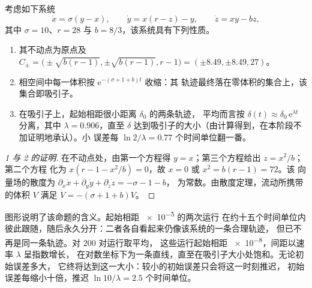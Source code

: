 \begin{proposition}[洛伦茨系统]\label{prop:b2:weather-systems:lorenz}
考虑如下系统
\[
  \dot x = \sigma(y - x), \qquad \dot y = x(r - z) - y, \qquad \dot z = xy - bz,
\]
其中 $\sigma = 10$、$r = 28$ 与 $b = 8/3$，该系统具有下列性质。
\begin{enumerate}
  \item 其不动点为原点及 $C_\pm = \bigl(\pm\sqrt{b(r - 1)}, \pm\sqrt{b(r - 1)},
        r - 1\bigr) = (\pm 8.49, \pm 8.49, 27)$。
  \item 相空间中每一体积按 $\mathrm{e}^{-(\sigma + 1 + b)t}$ 收缩：其
        轨迹最终落在零体积的集合上，该集合即吸引子。
  \item 在吸引子上，起始相距很小距离 $\delta_0$ 的两条轨迹，
        平均而言按 $\delta(t) \approx \delta_0\,\mathrm{e}^{\lambda t}$ 分离，其中 $\lambda =
        0.906$，直至 $\delta$ 达到吸引子的大小（由计算得到，在本阶段不加证明地承认）。小
        误差每 $\ln 2/\lambda = 0.77$ 个时间单位翻一番。
\end{enumerate}
\end{proposition}

\begin{proof}[1 与 2 的证明]
在不动点处，由第一个方程得 $y = x$；第三个方程给出 $z = x^2/b$；第二个方程
化为 $x(r - 1 - x^2/b) = 0$，故 $x = 0$ 或 $x^2 = b(r - 1) = 72$。该
向量场的散度为 $\partial_x\dot x + \partial_y\dot y + \partial_z\dot z = -\sigma - 1 - b$，
为常数。由散度定理，流动所携带的体积 $V$ 满足 $\dot V =
-(\sigma + 1 + b)V$。
\end{proof}

图形说明了该命题的含义。起始相距 \num{e-5} 的两次运行
在约十五个时间单位内彼此跟随，随后永久分开：二者各自看起来仍像该系统的一条合理轨迹，
但已不再是同一条轨迹。对 200 对运行取平均，
这些运行起始相距 \num{e-8}，间距以速率 $\lambda$ 呈指数增长，
在对数坐标下为一条直线，直至在吸引子大小处饱和。无论初始误差多大，
它终将达到这一大小：较小的初始误差只会将这一时刻推迟，
初始误差每缩小十倍，推迟 $\ln 10/\lambda = 2.5$ 个时间单位。

